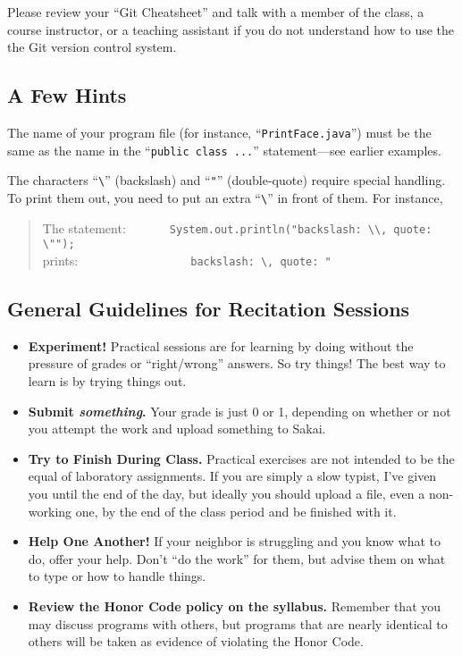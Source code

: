 Please review your ``Git Cheatsheet'' and talk with a member of the class, a course instructor, or a teaching assistant
if you do not understand how to use the the Git version control system.

\subsection*{A Few Hints}

The name of your program file (for instance, ``{\tt PrintFace.java}'')
must be the same as the name in the ``{\tt public class ...}''
statement---see earlier examples.

The characters ``\verb$\$'' (backslash) and ``\verb$"$'' (double-quote)
require special handling. To print them out, you need to put an extra
``\verb$\$'' in front of them. For instance,
\begin{quote}
The statement:\ \ \ \ \ \ \ \verb$System.out.println("backslash: \\, quote: \"");$\\
prints:\ \ \ \ \ \ \ \ \ \ \ \ \ \ \ \ \ \ 
\verb$backslash: \, quote: "$
\end{quote}
\subsection*{General Guidelines for Recitation Sessions}
\begin{itemize}
\item
{\bf Experiment!} 
Practical sessions are for learning by doing
without the pressure of grades or ``right/wrong'' answers. So try
things!  The best way to learn is by trying things out.
\item
{\bf Submit \textbf{\textit{something}}.} Your grade is just 0 or 1,
depending on whether or not you attempt the work and upload something to 
Sakai. 
\item
{\bf Try to Finish During Class.} Practical exercises are not intended
to be the equal of laboratory assignments. If you are simply a slow
typist, I've given you until the end of the day, but ideally you should
upload a file, even a non-working one, by the end of the class period and 
be finished with it.
\item
{\bf Help One Another!} 
If your neighbor is struggling and you know what
to do, offer your help. Don't ``do the work'' for them, but advise them on what
to type or how to handle things.
\item
{\bf Review the Honor Code policy on the syllabus.} Remember that you
may discuss programs with others, but programs that are nearly identical
to others will be taken as evidence of violating the Honor Code.
\end{itemize}

